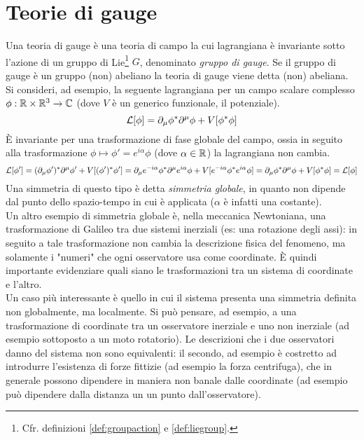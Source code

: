 \chapter{Teorie di gauge}

Una teoria di gauge è una teoria di campo la cui lagrangiana è invariante sotto
l'azione di un gruppo di Lie\footnote{
   Cfr. definizioni \ref{def:groupaction} e \ref{def:liegroup}.
} $G$, denominato \emph{gruppo di gauge}. Se il gruppo di gauge è un gruppo (non)
abeliano la teoria di gauge viene detta (non) abeliana.\\

Si consideri, ad esempio, la seguente lagrangiana per un campo scalare complesso
$\phi : \mathbb{R} \times \mathbb{R}^3 \to \mathbb{C}$ (dove $V$ è un generico funzionale, il potenziale).
$$
   \mathcal{L} [\phi] = \partial _\mu \phi^*  \partial ^\mu \phi + V[\phi ^* \phi]
$$
È invariante per una trasformazione di fase globale del campo, ossia in seguito
alla trasformazione
$
  \phi \mapsto \phi' = e^{i \alpha}\phi
$
(dove $\alpha \in \mathbb{R}$) la lagrangiana non cambia.
$$
   \mathcal{L} [\phi'] = (\partial _\mu \phi')^*  \partial ^\mu \phi' + V[(\phi')^* \phi']
                = \partial _\mu  e^{-i \alpha}\phi^*  \partial ^\mu  e^{i \alpha}\phi
                   +  V[e^{-i \alpha}\phi ^*  e^{i \alpha}\phi]
                = \partial _\mu \phi^*  \partial ^\mu \phi + V[\phi ^* \phi]
                = \mathcal{L} [\phi]
$$
Una simmetria di questo tipo è detta \emph{simmetria globale}, in quanto non dipende
dal punto dello spazio-tempo in cui è applicata ($\alpha$ è infatti una costante).\\

Un altro esempio di simmetria globale è, nella meccanica Newtoniana, una
trasformazione di Galileo tra due sistemi inerziali (es: una rotazione degli assi):
in seguito a tale trasformazione non cambia la descrizione fisica del fenomeno,
ma solamente i "numeri" che ogni osservatore usa come coordinate. È quindi importante
evidenziare quali siano le trasformazioni tra un sistema di coordinate e l'altro.\\

Un caso più interessante è quello in cui il sistema presenta una simmetria definita
non globalmente, ma localmente. Si può pensare, ad esempio, a una trasformazione
di coordinate tra un osservatore inerziale e uno non inerziale (ad esempio sottoposto
a un moto rotatorio). Le descrizioni che i due osservatori danno del sistema
non sono equivalenti: il secondo, ad esempio è costretto ad introdurre l'esistenza
di forze fittizie (ad esempio la forza centrifuga), che in generale possono dipendere
in maniera non banale dalle coordinate (ad esempio può dipendere dalla distanza
un un punto dall'osservatore).\\


